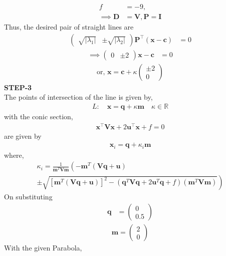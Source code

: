 \documentclass[10pt,a4paper]{report}
\newcommand{\myvec}[1]{\ensuremath{\begin{pmatrix}#1\end{pmatrix}}}
\let\vec\mathbf
\providecommand{\abs}[1]{\left\vert#1\right\vert}
\let\vec\mathbf
\providecommand{\brak}[1]{\ensuremath{\left(#1\right)}}
\providecommand{\lbrak}[1]{\ensuremath{\left(#1\right.}}
\providecommand{\rbrak}[1]{\ensuremath{\left.#1\right)}}
\providecommand{\sbrak}[1]{\ensuremath{{}\left[#1\right]}}
\begin{document}
\begin{multicols}{2}
\begin{align}
	f&=-9,
	\\
	\implies \vec{D} &= \vec{V}, \vec{P} = \vec{I}
    \end{align}
Thus, the desired pair of straight lines are \\ 
\begin{align} 
	\myvec{\sqrt{\abs{\lambda_1}} & \pm \sqrt{\abs{\lambda_2}}}\vec{P}^{\top}\brak{\vec{x}-\vec{c}} &= 0
\end{align}
\begin{align}
	\implies\myvec{0 & \pm 2}\vec{x}-\vec{c} &= 0
\end{align}
\begin{align}
	\text{or, }\vec{x} =\vec{c} + \kappa \myvec{\pm 2 \\ 0}
\end{align} 
\textbf{STEP-3}\vspace{2mm}\\
The points of intersection of the line is given by, \\ 
\begin{align}
L: \quad \vec{x} = \vec{q} + \kappa \vec{m} \quad \kappa \in \mathbb{R}
\end{align}
with the conic section, \\ 
\begin{align}
	\vec{x}^{\top}\vec{V}\vec{x} + 2\vec{u}^{\top} \vec{x} + f = 0
\end{align}
are given by \\
\begin{align}
\vec{x}_i = \vec{q} + \kappa_i \vec{m}
\end{align}
where, \\
{\tiny
\begin{multline}
\kappa_i = \frac{1}
{
\vec{m}^T\vec{V}\vec{m}
}
\lbrak{-\vec{m}^T\brak{\vec{V}\vec{q}+\vec{u}}}
\\
\pm
\rbrak{\sqrt{
\sbrak{
\vec{m}^T\brak{\vec{V}\vec{q}+\vec{u}}
}^2
-
\brak
{
\vec{q}^T\vec{V}\vec{q} + 2\vec{u}^T\vec{q} +f
}
\brak{\vec{m}^T\vec{V}\vec{m}}
}
}
\end{multline}
}
On substituting\\
\begin{align}
\vec{q} &= \myvec{
0\\
0.5
} 
\end{align}
\begin{align}
\vec{m} = \myvec{2 \\ 0}
\end{align}
With the given Parabola,\\ 
\begin{align}

\end{align}
\end{multicols}
\end{document}
